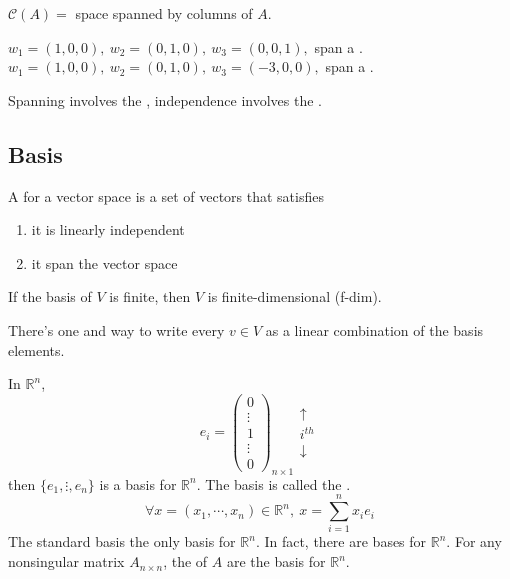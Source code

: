 \begin{eg}
    $\mathcal{C}(A) = $ space spanned by columns of $A$.
\end{eg}

\begin{eg}
    $w_1 = (1, 0, 0), \ w_2 = (0, 1, 0), \ w_3 = (0, 0, 1),$ span a . \\
    $w_1 = (1, 0, 0), \ w_2 = (0, 1, 0), \ w_3 = (-3, 0, 0),$ span a .
\end{eg}

\begin{note}
    Spanning involves the , independence involves the .
\end{note}

\subsection{Basis}

\begin{definition}[2I]
    A  for a vector space is a set of vectors that satisfies
    \begin{enumerate}[label=(\roman*)]
        \item it is linearly independent 
        \item it span the vector space
    \end{enumerate}
    If the basis of $V$ is finite, then $V$ is finite-dimensional (f-dim).
\end{definition}

\begin{remark}[1]
    There's one and  way to write every $v \in V$ as a linear combination of the basis elements.
\end{remark}

\newpage

\begin{remark}[2]
    In $\mathbb{R}^n$, 
    \[
    e_i = \begin{pmatrix}
        0 \\ \vdots \\ 1 \\ \vdots \\ 0
    \end{pmatrix}_{n\times 1}\begin{matrix}
        \uparrow \\ i^{th} \\ \downarrow
    \end{matrix}
    \]
    then $\{e_1, \vdots, e_n\}$ is a basis for $\mathbb{R}^n$. The basis is called the .
    \[
        \forall x = (x_1, \cdots, x_n) \in \mathbb{R}^n, \ x = \sum_{i=1}^n x_i e_i
    \]
    The standard basis  the only basis for $\mathbb{R}^n$. In fact, there are  bases for $\mathbb{R}^n$. For any nonsingular matrix $A_{n \times n}$, the  of $A$ are the basis for $\mathbb{R}^n$.
\end{remark}


